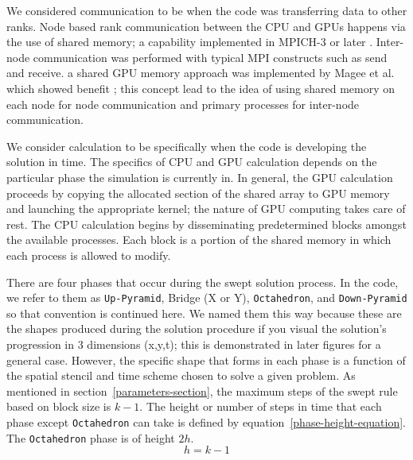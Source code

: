 \documentclass[review]{elsarticle}
\def\Up{\texttt{Up-Pyramid}}
\def\Down{\texttt{Down-Pyramid}}
\def\Oct{\texttt{Octahedron}}
\begin{document}
\par
 We considered communication to be when the code was transferring data to other ranks. Node based rank communication between the CPU and GPUs happens via the use of shared memory; a capability implemented in MPICH-3 or later \cite{Hoefler2013MPIMemory}. Inter-node communication was performed with typical MPI constructs such as send and receive. a shared GPU memory approach was implemented by Magee et al. which showed benefit \cite{Magee2018AcceleratingDecomposition}; this concept lead to the idea of using shared memory on each node for node communication and primary processes for inter-node communication.
 
 \par
 We consider calculation to be specifically when the code is developing the solution in time. The specifics of CPU and GPU calculation depends on the particular phase the simulation is currently in. In general, the GPU calculation proceeds by copying the allocated section of the shared array to GPU memory and launching the appropriate kernel; the nature of GPU computing takes care of rest. The CPU calculation begins by disseminating predetermined blocks amongst the available processes. Each block is a portion of the shared memory in which each process is allowed to modify.
 
\par
There are four phases that occur during the swept solution process. In the code, we refer to them as \Up{}, Bridge (X or Y), \Oct{}, and \Down{} so that convention is continued here. We named them this way because these are the shapes produced during the solution procedure if you visual the solution's progression in 3 dimensions (x,y,t); this is demonstrated in later figures for a general case. However, the specific shape that forms in each phase is a function of the spatial stencil and time scheme chosen to solve a given problem. As mentioned in section~\ref{parameters-section}, the maximum steps of the swept rule based on block size is $k-1$. The height or number of steps in time that each phase except \Oct{} can take is defined by equation~\ref{phase-height-equation}. The \Oct{} phase is of height $2h$.
\begin{equation}
    \label{phase-height-equation}
    h=k-1
\end{equation}
 
\end{document}
